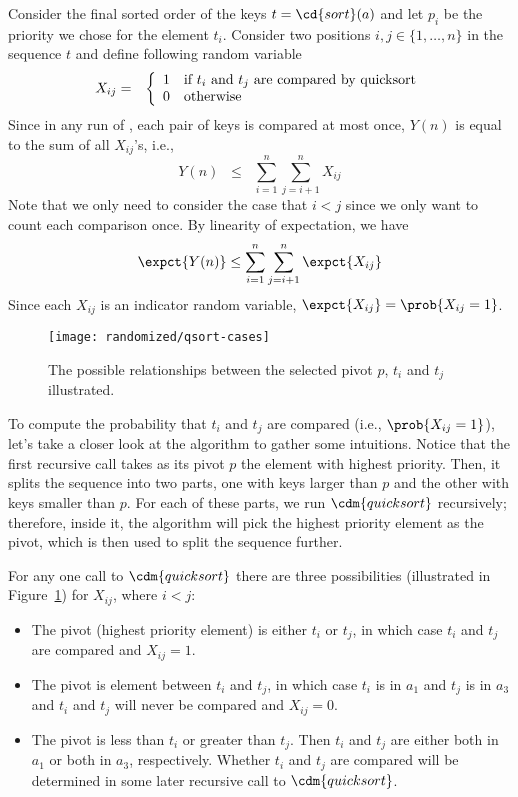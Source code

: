 {Consider the final sorted order of the keys $t = \cd{sort}(a)$
%
and
%
let $p_i$ be the priority we chose for the element $t_i$. 
%
Consider two positions $i, j \in \{1, \dots, n\}$ in the sequence $t$
and define following random variable
\begin{eqnarray*}
X_{ij} 
%
& = &
%
\left\{\begin{array}{ll}
1 & \mbox{if $t_i$ and $t_j$ are compared by \qsort{}}\\
0 & \mbox{otherwise}
\end{array}\right.
\end{eqnarray*}
%
Since in any run of \qsort{}, each pair of keys is compared at most
once, $Y(n)$ is equal to the sum of all $X_{ij}$'s, i.e.,
\[
Y(n) \;\; \leq \;\; \sum_{i=1}^n \sum_{j=i+1}^n X_{ij}
\]
Note that we only need to consider the case that $i < j$ since we only
want to count each comparison once.
By linearity of expectation, we have
\[
 \expct{Y(n)} \leq \sum_{i=1}^n \sum_{j=i+1}^n \expct{X_{ij}}
\]
%
Since each $X_{ij}$ is an indicator random variable,
$\expct{X_{ij}} = \prob{X_{ij} = 1}$.  


\begin{figure}
\centering
\texttt{[image: randomized/qsort-cases]}
\caption{The possible relationships between the selected pivot $p$, $t_i$ and $t_j$ illustrated.}
\label{fig:lec18::cases}
\end{figure}


To compute the probability that $t_i$ and $t_j$ are compared (i.e.,
$\prob{X_{ij}=1}$), 
%
let's take a closer look at the \qsort{} algorithm to gather some
intuitions.  
%
Notice that the first recursive call takes as its pivot $p$ the
element with highest priority.  
%
Then, it splits the sequence into two parts, one with keys larger than
$p$ and the other with keys smaller than $p$.  For each of these
parts, we run $\cdm{\qsort{}}$ recursively; therefore, inside it, the
algorithm will pick the highest priority element as the pivot, which
is then used to split the sequence further.

For any one call to $\cdm{\qsort{}}$ there are three possibilities
(illustrated in Figure~\ref{fig:lec18::cases})
for $X_{ij}$, where $i < j$:
\begin{itemize}
\item The pivot (highest priority element) is either $t_i$ or $t_j$,
  in which case $t_i$ and $t_j$ are compared and $X_{ij} = 1$.
\item The pivot is element between $t_i$ and $t_j$, in which case
  $t_i$ is in $a_1$ and $t_j$ is in $a_3$ and $t_i$ and $t_j$ will
  never be compared and $X_{ij} = 0$.
\item The pivot is less than $t_i$ or greater than $t_j$.  Then 
  $t_i$ and $t_j$ are either both in $a_1$ or both in $a_3$,
  respectively.  Whether $t_i$ and $t_j$ are compared will be
  determined in some later recursive call to $\cdm{\qsort{}}$.
\end{itemize}

}
